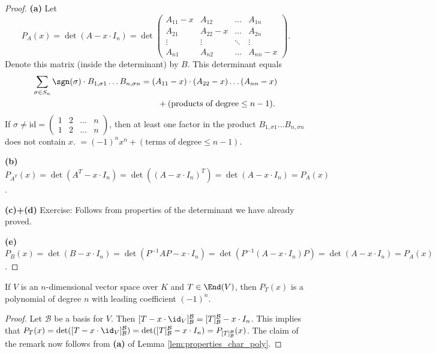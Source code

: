 \begin{proof}
  \textbf{(a)} Let
  \[P_A(x) = \det(A - x \cdot I_n) = \det\begin{pmatrix} A_{11}-x & A_{12} & \dots & A_{1n} \\ A_{21} & A_{22}-x & \dots & A_{2n} \\ \vdots & \vdots & \ddots & \vdots \\ A_{n1} & A_{n2} & \dots & A_{nn}-x \end{pmatrix}. \]
  Denote this matrix (inside the determinant) by $B$. This determinant equals 
  \begin{align*}
    \sum_{\sigma \in S_n} \sgn(\sigma) \cdot B_{1, \sigma 1} \dots B_{n, \sigma n} 
    & = (A_{11}-x) \cdot (A_{22}-x) \dots (A_{nn}-x) \\
    & \qquad + (\text{products of degree} \le n-1).
  \end{align*}
  If $\sigma \ne \mathrm{id} = \left(\begin{smallmatrix} 1 & 2 & \dots & n \\ 1 & 2 & \dots & n \end{smallmatrix}\right)$, then at least one factor in the product $B_{1, \sigma 1} \dots B_{n, \sigma n}$ does not contain $x$.
  $= (-1)^n x^n + (\text{terms of degree} \le n-1)$.

  \textbf{(b)} $P_{A^T}(x) = \det(A^T - x \cdot I_n) = \det((A - x \cdot I_n)^T) = \det(A - x \cdot I_n) = P_A(x)$.

  \textbf{(c)+(d)} Exercise: Follows from properties of the determinant we have already proved.

  \textbf{(e)} $P_B(x) = \det(B - x \cdot I_n) = \det(P^{-1}AP - x \cdot I_n) = \det(P^{-1}(A - x \cdot I_n)P) = \det(A - x \cdot I_n) = P_A(x)$.
\end{proof}

\begin{remark}\label{rem:char_poly_degree}
  If $V$ is an $n$-dimensional vector space over $K$ and $T \in \End(V)$, then $P_T(x)$ is a polynomial of degree $n$ with leading coefficient $(-1)^n$.
\end{remark}
\begin{proof}
  Let $\mathcal{B}$ be a basis for $V$. Then $[T - x \cdot \id_V]_{\mathcal{B}}^{\mathcal{B}} = [T]_{\mathcal{B}}^{\mathcal{B}} - x \cdot I_n$. This implies that $P_T(x) = \det([T - x \cdot \id_V]_{\mathcal{B}}^{\mathcal{B}}) = \det([T]_{\mathcal{B}}^{\mathcal{B}} - x \cdot I_n) = P_{[T]_{\mathcal{B}}^{\mathcal{B}}}(x)$. The claim of the remark now follows from \textbf{(a)} of Lemma \ref{lem:properties_char_poly}.
\end{proof}

